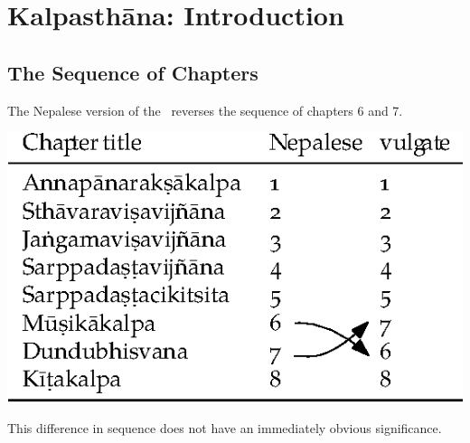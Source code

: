 \chapter{Kalpasthāna: Introduction}

\section{The Sequence of Chapters}
\label{kalpa-chapter-sequence}
The Nepalese version of the \SS\ reverses the sequence of chapters 6 and 7.  

\begin{table}[h]
    \centering
     \includegraphics[width=0.65\linewidth]{chapters/media/kalpa}
\end{table}


\noindent
This difference in sequence does not have an immediately obvious 
significance.